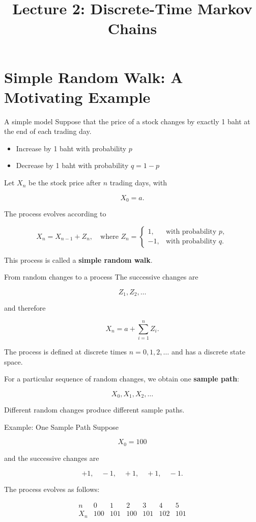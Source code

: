 \documentclass[
  ignorenonframetext,
  aspectratio=169,
]{beamer}
\title{\texorpdfstring{Lecture 2: Discrete-Time Markov
Chains}{Lecture 2: Discrete-Time Markov Chains}}
\author{}
\date{}
\providecommand{\tightlist}{%
  \setlength{\itemsep}{0pt}\setlength{\parskip}{0pt}}
\begin{document}
\frame{\titlepage}


\section{Simple Random Walk: A Motivating
Example}\label{simple-random-walk-a-motivating-example}

\begin{frame}{A simple model}
\protect{}\label{a-simple-model}
Suppose that the price of a stock changes by exactly 1 baht at the end
of each trading day.

\begin{itemize}
\tightlist
\item
  Increase by 1 baht with probability \(p\)
\item
  Decrease by 1 baht with probability \(q=1-p\)
\end{itemize}

Let \(X_n\) be the stock price after \(n\) trading days, with

\[
X_0=a.
\]

The process evolves according to

\[
X_n=X_{n-1}+Z_n, \quad \text{where } Z_n=
\begin{cases}
1, & \text{with probability }p,\\
-1, & \text{with probability }q.
\end{cases}
\]

This process is called a \textbf{simple random walk}.
\end{frame}

\begin{frame}{From random changes to a process}
\protect{}\label{from-random-changes-to-a-process}
The successive changes are

\[
Z_1,Z_2,\ldots
\]

and therefore

\[
X_n=a+\sum_{i=1}^n Z_i.
\]

The process is defined at discrete times \(n=0,1,2,\ldots\) and has a
discrete state space.

For a particular sequence of random changes, we obtain one
\textbf{sample path}:

\[
X_0,X_1,X_2,\ldots
\]

Different random changes produce different sample paths.
\end{frame}

\begin{frame}{Example: One Sample Path}
\protect{}\label{example-one-sample-path}
Suppose

\[
X_0=100
\]

and the successive changes are

\[
+1,\quad -1,\quad +1,\quad +1,\quad -1.
\]

The process evolves as follows:

\[
\begin{array}{c|cccccc}
n & 0&1&2&3&4&5\\
\hline
X_n &100&101&100&101&102&101
\end{array}
\]
\end{frame}
\end{document}
